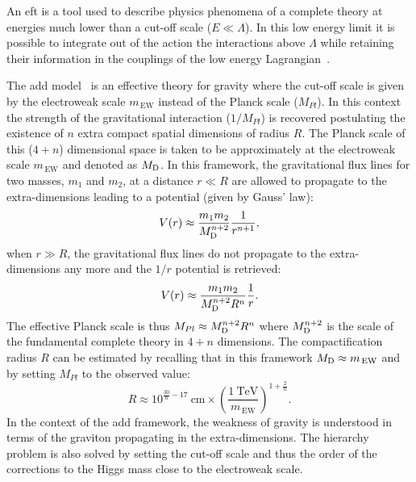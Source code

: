 An \gls{eft} is a tool used to describe physics phenomena of a complete theory
at energies much lower than a cut-off scale ($E \ll \Lambda$). In this low
energy limit it is possible to integrate out of the action the interactions
above $\Lambda$ while retaining their information in the couplings of the low
energy Lagrangian~\cite{EFTReview}.

The \gls{add} model~\cite{ADDPaper} is an effective theory for gravity where the
cut-off scale is given by the electroweak scale $m_\mathrm{\, EW}$ instead of
the Planck scale ($M_{Pl}$). In this context the strength of the gravitational
interaction ($1/M_{Pl}$) is recovered postulating the existence of $n$ extra
compact spatial dimensions of radius $R$. The Planck scale of this ($4 + n$)
dimensional space is taken to be approximately at the electroweak scale
$m_\mathrm{\, EW}$ and denoted as $M_\mathrm{D}$. In this framework, the gravitational
flux lines for two masses, $m_1$ and $m_2$, at a distance $r \ll R$ are allowed
to propagate to the extra-dimensions leading to a potential (given by Gauss'
law):
\begin{equation}
  \label{eq:67}
  V(r) \approx \frac{m_1 m_2}{M_\mathrm{D}^{n + 2}} \frac{1}{r^{n + 1}},
\end{equation}
when $r \gg R$, the gravitational flux lines do not propagate to the
extra-dimensions any more and the $1/r$ potential is retrieved:
\begin{equation}
  \label{eq:68}
  V(r) \approx \frac{m_1 m_2}{M_\mathrm{D}^{n + 2} R^n} \frac{1}{r}.
\end{equation}
The effective Planck scale is thus $M_{Pl} \approx M_\mathrm{D}^{n + 2} R^n$ where
$M_\mathrm{D}^{n + 2}$ is the scale of the fundamental complete theory in $4 + n$
dimensions. The compactification radius $R$ can be estimated by recalling that
in this framework $M_\mathrm{D} \approx m_\mathrm{\, EW}$ and by setting $M_{Pl}$ to the
observed value:
\begin{equation}
  \label{eq:69}
  R \approx 10^{\frac{30}{n} - 17}~\mathrm{cm} \times \left(
    \frac{1~\mathrm{TeV}}{m_\mathrm{\, EW}} \right)^{1 + \frac{2}{n}}.
\end{equation}
In the context of the \gls{add} framework, the weakness of gravity is understood
in terms of the graviton propagating in the extra-dimensions. The hierarchy
problem is also solved by setting the cut-off scale and thus the order of the
corrections to the Higgs mass close to the electroweak scale.
